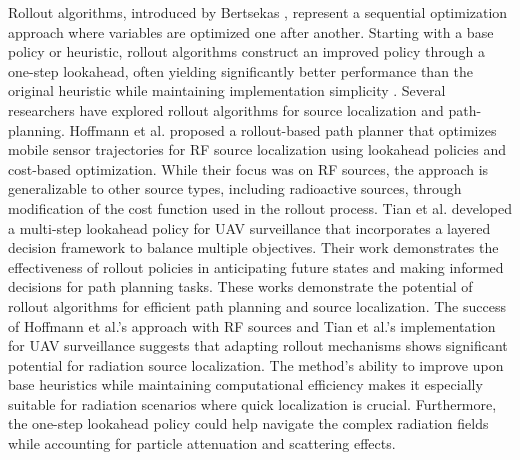 \documentclass[../report.tex]{subfiles}
\begin{document}
    Rollout algorithms, introduced by Bertsekas \cite{bertsekas2013rollout}, represent a sequential optimization approach where variables are optimized one after another. Starting with a base policy or heuristic, rollout
    algorithms construct an improved policy through a one-step lookahead, often yielding significantly better performance than the original heuristic while maintaining implementation 
    simplicity \cite{bertsekas2013rollout}. Several researchers have explored rollout algorithms for source localization and path-planning. Hoffmann et al.\cite{rolloutHoffmann2019} proposed
    a rollout-based path planner that optimizes mobile sensor trajectories for RF source localization using lookahead policies and cost-based optimization. While their focus was on RF sources, 
    the approach is generalizable to other source types, including radioactive sources, through modification of the cost function used in the rollout process. Tian et al. developed 
    a multi-step lookahead policy for UAV surveillance that incorporates a layered decision framework to balance multiple objectives\cite{rolloutMultiStepLookaheadTian2008}. Their work 
    demonstrates the effectiveness of rollout policies in anticipating future states and making informed decisions for path planning tasks. 
    These works demonstrate the potential of rollout algorithms for efficient path planning and source localization. The success of Hoffmann et al.'s approach with RF sources and Tian et al.'s implementation
    for UAV surveillance suggests that adapting rollout mechanisms shows significant potential for radiation source localization. The method's ability to improve upon base heuristics while
    maintaining computational efficiency makes it especially suitable for radiation scenarios where quick localization is crucial. Furthermore, the one-step lookahead policy could help navigate 
    the complex radiation fields while accounting for particle attenuation and scattering effects.
\end{document}
